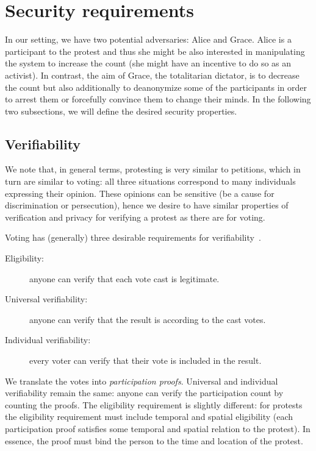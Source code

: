 \section{Security requirements}%
\label{Properties}


In our setting, we have two potential adversaries: Alice and Grace.
Alice is a participant to the protest and thus she might be also interested in 
manipulating the system to increase the count (\eg she might have an incentive 
to do so as an activist).
In contrast, the aim of Grace, the totalitarian dictator, is to decrease the 
count but also additionally to deanonymize some of the participants in order to 
arrest them or forcefully convince them to change their minds.
In the following two subsections, we will define the desired security 
properties.

\subsection{Verifiability}%
\label{Verifiability}

We note that, in general terms, protesting is very similar to petitions, which 
in turn are similar to voting: all three situations correspond to many 
individuals expressing their opinion.
These opinions can be sensitive (\eg be a cause for discrimination or 
persecution), hence we desire to have similar properties of verification and 
privacy for verifying a protest as there are for voting.

Voting has (generally) three desirable requirements for verifiability~\cite{VerifyingPrivacyPropertiesOfVotingProtocols}.
\begin{description}
  \item[Eligibility:] anyone can verify that each vote cast is legitimate.
  \item[Universal verifiability:] anyone can verify that the result is according 
    to the cast votes.
  \item[Individual verifiability:] every voter can verify that their vote is 
    included in the result.
\end{description}
We translate the votes into \emph{participation proofs}.
Universal and individual verifiability remain the same: anyone can verify the participation count by counting the proofs.
The eligibility requirement is slightly different: for protests the eligibility 
requirement must include temporal and spatial eligibility (\ie each 
participation proof satisfies some temporal and spatial relation to the 
protest).
In essence, the proof must bind the person to the time and location of the protest.

